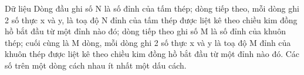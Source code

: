 Dữ liệu
Dòng đầu ghi số N là số đỉnh của tấm thép; dòng tiếp theo, mỗi dòng ghi 2 số thực x và y, là toạ độ N đỉnh của tấm thép được liệt kê theo chiều   kim đồng hồ bắt đầu từ một đỉnh nào đó; dòng tiếp theo ghi số M là số đỉnh của khuôn thép; cuối cùng là M dòng, mỗi dòng ghi 2 số thực x và y là toạ   độ M đỉnh của khuôn thép được liệt kê theo chiều kim đồng hồ bắt đầu từ một đỉnh nào đó. Các số trên một dòng cách nhau ít nhất một dấu cách.
